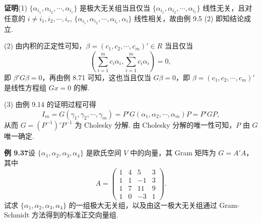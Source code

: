 \documentclass[UTF8, 12pt, fontset=fandol, oneside]{ctexart}
\begin{document}
\noindent\textbf{证明}\quad (1) $\{\alpha_{i_1},\alpha_{i_2},\cdots,\alpha_{i_r}\}$ 是极大无关组当且仅当 $\{\alpha_{i_1},\alpha_{i_2},\cdots,\alpha_{i_r}\}$ 线性无关，且对任意的 $i\ne i_1,i_2,\cdots,i_r$, $\{\alpha_{i_1},\alpha_{i_2},\cdots,\alpha_{i_r},\alpha_i\}$ 线性相关，故由例 9.5 (2) 即知结论成立.

(2) 由内积的正定性可知，$\beta=(c_1,c_2,\cdots,c_m)'\in R$ 当且仅当
\[
\left(\sum_{i=1}^m c_i\alpha_i,\sum_{i=1}^m c_i\alpha_i\right)=0,
\]
即 $\beta'G\beta=0$，再由例 8.71 可知，这也当且仅当 $G\beta=0$，即 $\beta=(c_1,c_2,\cdots,c_m)'$ 是线性方程组 $Gx=0$ 的解.

(3) 由例 9.14 的证明过程可得
\[
I_m=G(\gamma_1,\gamma_2,\cdots,\gamma_m)=P'G(\alpha_1,\alpha_2,\cdots,\alpha_m)P=P'GP,
\]
从而 $G=(P^{-1})'P^{-1}$ 为 Cholesky 分解. 由 Cholesky 分解的唯一性可知，$P$ 由 $G$ 唯一确定.

\noindent\textbf{例 9.37}\quad 设 $\{\alpha_1,\alpha_2,\alpha_3,\alpha_4\}$ 是欧氏空间 $V$ 中的向量，其 Gram 矩阵为 $G=A'A$，其中
\[
A=
\begin{pmatrix}
1&4&5&3\\
1&1&-1&3\\
1&7&11&9\\
1&0&-3&1
\end{pmatrix}.
\]
试求 $\{\alpha_1,\alpha_2,\alpha_3,\alpha_4\}$ 的一组极大无关组，以及由这一极大无关组通过 Gram-Schmidt 方法得到的标准正交向量组.
\end{document}
